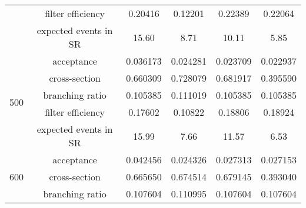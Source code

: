 \begin{table}[p]
{{\begin{tabular}{cccccc}
                                         & filter efficiency     & 0.20416                                    & 0.12201                                        & 0.22389                                    & 0.22064\\
                                         & expected events in SR & 15.60                                      & 8.71                                           & 10.11                                      & 5.85\\
                \hline
                \multirow{5}{*}{500}     & acceptance            & 0.036173                                   & 0.024281                                       & 0.023709                                   & 0.022937\\
                                         & cross-section         & 0.660309                                   & 0.728079                                       & 0.681917                                   & 0.395590\\
                                         & branching ratio       & 0.105385                                   & 0.111019                                       & 0.105385                                   & 0.105385\\
                                         & filter efficiency     & 0.17602                                    & 0.10822                                        & 0.18806                                    & 0.18924\\
                                         & expected events in SR & 15.99                                      & 7.66                                           & 11.57                                      & 6.53\\
                \hline
                \multirow{5}{*}{600}     & acceptance            & 0.042456                                   & 0.024326                                       & 0.027313                                   & 0.027153\\
                                         & cross-section         & 0.665650                                   & 0.674514                                       & 0.679145                                   & 0.393040\\
                                         & branching ratio       & 0.107604                                   & 0.110995                                       & 0.107604                                   & 0.107604\\

\end{tabular}}}
\end{table}
